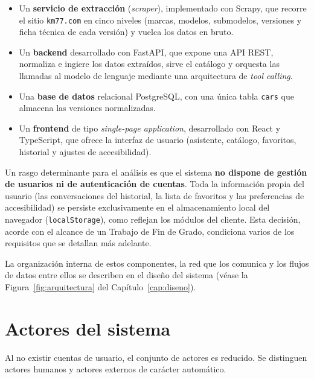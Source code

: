 \begin{itemize}
  \item Un \textbf{servicio de extracción} (\emph{scraper}), implementado con
        Scrapy, que recorre el sitio \texttt{km77.com} en cinco niveles
        (marcas, modelos, submodelos, versiones y ficha técnica de cada
        versión) y vuelca los datos en bruto.
  \item Un \textbf{backend} desarrollado con FastAPI, que expone una API REST,
        normaliza e ingiere los datos extraídos, sirve el catálogo y orquesta
        las llamadas al modelo de lenguaje mediante una arquitectura de
        \emph{tool calling}.
  \item Una \textbf{base de datos} relacional PostgreSQL, con una única tabla
        \texttt{cars} que almacena las versiones normalizadas.
  \item Un \textbf{frontend} de tipo \emph{single-page application},
        desarrollado con React y TypeScript, que ofrece la interfaz de usuario
        (asistente, catálogo, favoritos, historial y ajustes de accesibilidad).
\end{itemize}

Un rasgo determinante para el análisis es que el sistema \textbf{no dispone de
gestión de usuarios ni de autenticación de cuentas}. Toda la información propia
del usuario (las conversaciones del historial, la lista de favoritos y las
preferencias de accesibilidad) se persiste exclusivamente en el almacenamiento
local del navegador (\texttt{localStorage}), como reflejan los módulos del
cliente. Esta decisión, acorde con el alcance de un Trabajo de Fin de Grado,
condiciona varios de los requisitos que se detallan más adelante.

La organización interna de estos componentes, la red que los comunica y los
flujos de datos entre ellos se describen en el diseño del sistema (véase la
Figura~\ref{fig:arquitectura} del Capítulo~\ref{cap:diseno}).

\section{Actores del sistema}
\label{sec:req-actores}

Al no existir cuentas de usuario, el conjunto de actores es reducido. Se
distinguen actores humanos y actores externos de carácter automático.

